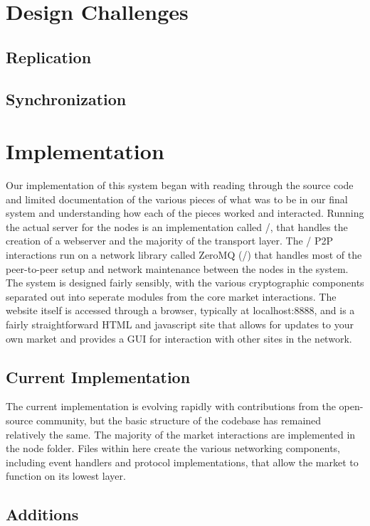 \documentclass[12pt,twocolumn]{article}
\begin{document}
\section{Design Challenges}
\subsection{Replication}
\subsection{Synchronization}



\section{Implementation}
Our implementation of this system began with reading through the source code and limited documentation of the various pieces of what was to be in our final system and understanding how each of the pieces worked and interacted.
Running the actual server for the nodes is an implementation called \Tornado/, that handles the creation of a webserver and the majority of the transport layer.
The \OpenBazaar/ P2P interactions run on a network library called ZeroMQ (\ZMQ/) that handles most of the peer-to-peer setup and network maintenance between the nodes in the system.
The system is designed fairly sensibly, with the various cryptographic components separated out into seperate modules from the core market interactions.
The website itself is accessed through a browser, typically at {{\sc localhost:8888}}, and is a fairly straightforward HTML and javascript site that allows for updates to your own market and provides a GUI for interaction with other sites in the network.

\subsection{Current Implementation}
The current implementation is evolving rapidly with contributions from the open-source community, but the basic structure of the codebase has remained relatively the same.
The majority of the market interactions are implemented in the node folder.
Files within here create the various networking components, including event handlers and protocol implementations, that allow the market to function on its lowest layer. 

\subsection{Additions}
\end{document}
